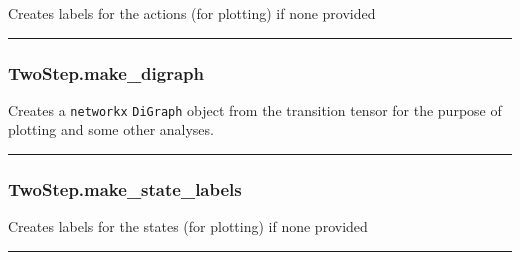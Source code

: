 \begin{Shaded}
\begin{Highlighting}[]
\NormalTok{)}
\end{Highlighting}
\end{Shaded}

Creates labels for the actions (for plotting) if none provided

\begin{center}\rule{0.5\linewidth}{\linethickness}\end{center}

\hypertarget{twostep.make_digraph}{%
\subsubsection{TwoStep.make\_digraph}\label{twostep.make_digraph}}

\begin{Shaded}
\begin{Highlighting}[]
\NormalTok{)}
\end{Highlighting}
\end{Shaded}

Creates a \texttt{networkx} \texttt{DiGraph} object from the transition
tensor for the purpose of plotting and some other analyses.

\begin{center}\rule{0.5\linewidth}{\linethickness}\end{center}

\hypertarget{twostep.make_state_labels}{%
\subsubsection{TwoStep.make\_state\_labels}\label{twostep.make_state_labels}}

\begin{Shaded}
\begin{Highlighting}[]
\NormalTok{)}
\end{Highlighting}
\end{Shaded}

Creates labels for the states (for plotting) if none provided

\begin{center}\rule{0.5\linewidth}{\linethickness}\end{center}

